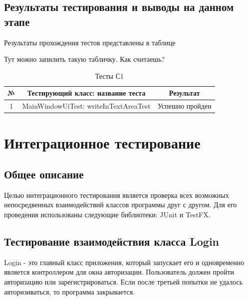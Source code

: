 \documentclass[a4paper,12pt]{article}
\begin{document}
\subsection{Результаты тестирования и выводы на данном этапе}
Результаты прохождения тестов представлены в таблице 

Тут можно запилить такую табличку. Как считаешь?

\begin{table}[h]
	\caption{Тесты С1}
	\centering
	\begin{tabular}{|c|c|c|}
	\hline 
	№ & Тестирующий класс: название теста & Результат \\ 
	\hline 
	1 & MainWindowUiTest: writeInTextAreaTest & Успешно пройден  \\
	\hline 
\end{tabular} 
\label{table:tests_C1} 
\end{table}


\newpage \section{Интеграционное тестирование}
\subsection{Общее описание}
Целью интеграционного тестирования является проверка всех возможных непосредвенных взаимодействий классов программы друг с другом. 
Для его проведения использованы следующие библиотеки: JUnit и TestFX.

\newpage\subsection{Тестирование взаимодействия класса Login}
Login - это главный класс приложения, который запускает его и одновременно является контроллером для окна авторизации. Пользователь должен пройти авторизацию или зарегистрироваться. Если после третьей попытки не удалось авторизиваться, то программа закрывается.
\end{document}
